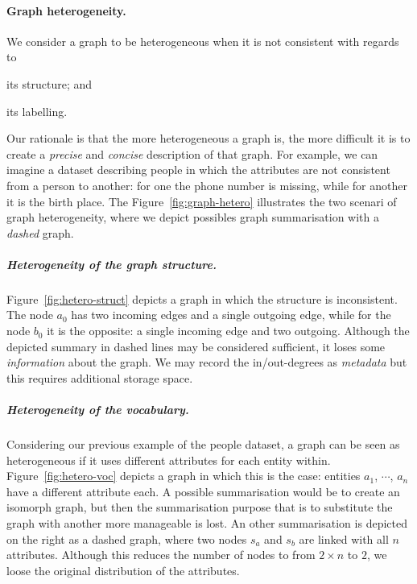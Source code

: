 \paragraph{Graph heterogeneity.}

We consider a graph to be heterogeneous when it is not consistent with regards to
\begin{inparaenum}[(a)]
\item its structure; and
\item its labelling.
\end{inparaenum}
Our rationale is that the more heterogeneous a graph is, the more difficult it is to create a \emph{precise} and \emph{concise} description of that graph. For example, we can imagine a dataset describing people in which the attributes are not consistent from a person to another: for one the phone number is missing, while for another it is the birth place. The Figure~\ref{fig:graph-hetero} illustrates the two scenari of graph heterogeneity, where we depict possibles graph summarisation with a \textit{dashed} graph.

\subparagraph{Heterogeneity of the graph structure.}

Figure~\ref{fig:hetero-struct} depicts a graph in which the structure is inconsistent. The node $a_0$ has two incoming edges and a single outgoing edge, while for the node $b_0$ it is the opposite: a single incoming edge and two outgoing. Although the depicted summary in dashed lines may be considered sufficient, it loses some \emph{information} about the graph. We may record the in/out-degrees as \emph{metadata} but this requires additional storage space.

\subparagraph{Heterogeneity of the vocabulary.}

Considering our previous example of the people dataset, a graph can be seen as heterogeneous if it uses different attributes for each entity within. Figure~\ref{fig:hetero-voc} depicts a graph in which this is the case: entities $a_1$, $\cdots$, $a_n$ have a different attribute each. A possible summarisation would be to create an isomorph graph, but then the summarisation purpose that is to substitute the graph with another more manageable is lost. An other summarisation is depicted on the right as a dashed graph, where two nodes $s_a$ and $s_b$ are linked with all $n$ attributes. Although this reduces the number of nodes to from $2 \times n$ to $2$, we loose the original distribution of the attributes.\\

